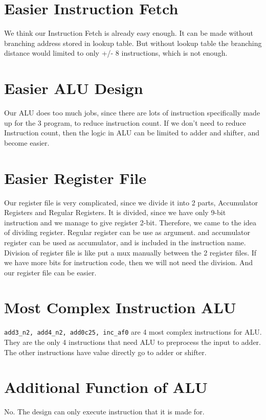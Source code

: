 \documentclass{article}
\begin{document}
  \section{Easier Instruction Fetch}
    \quad We think our Instruction Fetch is already easy enough.
    It can be made without branching address stored in lookup table.
    But without lookup table the branching distance would limited
    to only +/- 8 instructions, which is not enough.
  \section{Easier ALU Design}
    \quad Our ALU does too much jobs, since there are lots of
    instruction specifically made up for the 3 program, to reduce
    instruction count. If we don't need to reduce Instruction
    count, then the logic in ALU can be limited to adder and
    shifter, and become easier.
  \section{Easier Register File}
    \quad Our register file is very complicated, since we divide
    it into 2 parts, Accumulator Registers and Regular Registers.
    It is divided, since we have only 9-bit instruction and we
    manage to give register 2-bit. Therefore, we came to the idea
    of dividing register. Regular register can be use as argument.
    and accumulator register can be used as accumulator, and is
    included in the instruction name. Division of register file
    is like put a mux manually between the 2 register files. If we
    have more bits for instruction code, then we will not need
    the division. And our register file can be easier.
  \section{Most Complex Instruction ALU}
    \quad \texttt{add3\_n2, add4\_n2, add0c25, inc\_af0} are 4 most
    complex instructions for ALU. They are the only 4 instructions
    that need ALU to preprocess the input to adder. The other
    instructions have value directly go to adder or shifter.
  \section{Additional Function of ALU}
    No. The design can only execute instruction that it is made for.
\end{document}
